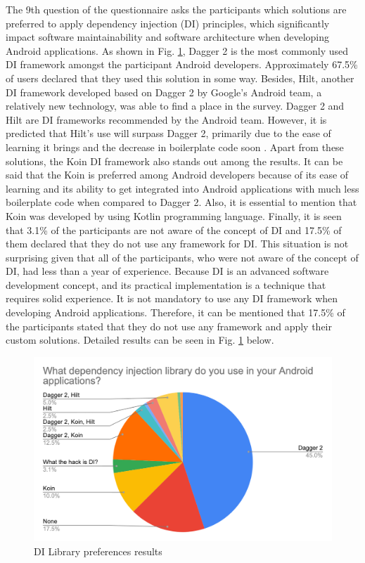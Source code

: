 The 9th question of the questionnaire asks the participants which solutions are preferred to apply dependency injection (DI) principles, which significantly impact software maintainability and software architecture when developing Android applications. As shown in Fig. \ref{fig:di_lib}, Dagger 2 is the most commonly used DI framework amongst the participant Android developers. Approximately 67.5\% of users declared that they used this solution in some way. Besides, Hilt, another DI framework developed based on Dagger 2 by Google's Android team, a relatively new technology, was able to find a place in the survey. Dagger 2 and Hilt are DI frameworks recommended by the Android team. However, it is predicted that Hilt's use will surpass Dagger 2, primarily due to the ease of learning it brings and the decrease in boilerplate code soon \cite{32}. Apart from these solutions, the Koin DI framework also stands out among the results. It can be said that the Koin is preferred among Android developers because of its ease of learning and its ability to get integrated into Android applications with much less boilerplate code when compared to Dagger 2. Also, it is essential to mention that Koin was developed by using Kotlin programming language. Finally, it is seen that 3.1\% of the participants are not aware of the concept of DI and 17.5\% of them declared that they do not use any framework for DI. This situation is not surprising given that all of the participants, who were not aware of the concept of DI, had less than a year of experience. Because DI is an advanced software development concept, and its practical implementation is a technique that requires solid experience. It is not mandatory to use any DI framework when developing Android applications. Therefore, it can be mentioned that 17.5\% of the participants stated that they do not use any framework and apply their custom solutions. Detailed results can be seen in Fig. \ref{fig:di_lib} below.
\begin{figure}[ht!]
    \centering
    \includegraphics[scale=0.25]{figures/di_lib.png}
    \caption{DI Library preferences results}
    \label{fig:di_lib}
\end{figure}
\FloatBarrier

